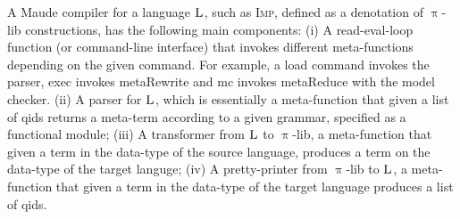 \documentclass{llncs}%
\begin{document}
A Maude compiler for a language $\textsc{L}$, such as \textsc{Imp}, defined as a denotation of $\uppi$-lib constructions, has the following main components:
(i) A read-eval-loop function (or command-line interface) that invokes different meta-functions depending on the given command. For example, a load command invokes the parser, exec invokes metaRewrite and mc invokes metaReduce with the model checker.
(ii) A parser for $\textsc{L}$, which is essentially a meta-function that given a list of qids returns a meta-term according to a given grammar, specified as a functional module;
(iii) A transformer from $\textsc{L}$ to $\uppi$-lib, a meta-function that given a term in the data-type of the source language, produces a term on the data-type of the target languge;
(iv) A pretty-printer from $\uppi$-lib to $\textsc{L}$, a meta-function that given a term in the data-type of the target language produces a list of qids.
\end{document}
